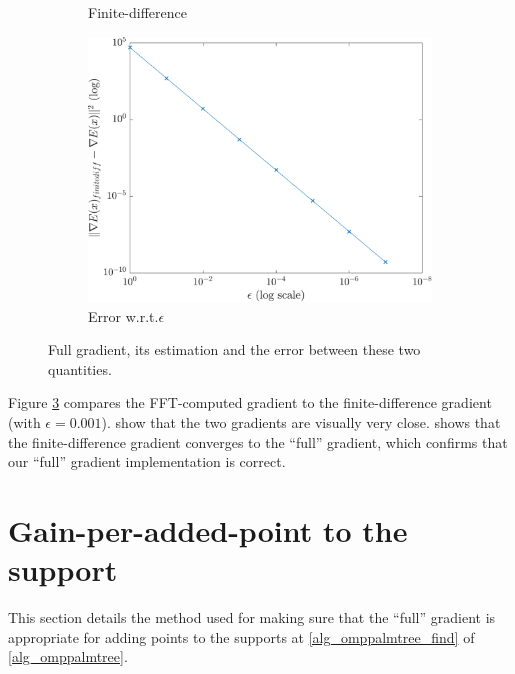 \begin{figure}[!ht]
\begin{subfigure}[b]{0.30\textwidth}
\caption{Finite-difference}\label{fig_verif_gradient-finite}
\end{subfigure}
\begin{subfigure}[b]{0.35\textwidth}\centering
\includegraphics[width=\textwidth]{figures/verif_gradient/finite-diff-vs-grad.pdf}
\caption{Error w.r.t.\@ $\epsilon$}\label{fig_verif_gradient-error}
\end{subfigure}
\caption{Full gradient, its estimation and the error between these two quantities.}\label{fig_verif_gradient}
\end{figure}

\noindent
Figure \ref{fig_verif_gradient} compares the FFT-computed gradient to the finite-difference gradient (with $\epsilon=0.001$).  show that the two gradients are visually very close.  shows that the finite-difference gradient converges to the “full” gradient, which confirms that our “full” gradient implementation is correct.

\section{Gain-per-added-point to the support}\label{sec_gain_per_added_point}

This section details the method used for making sure that the “full” gradient is appropriate for adding points to the supports at \cref{alg_omppalmtree_find} of \cref{alg_omppalmtree}.

